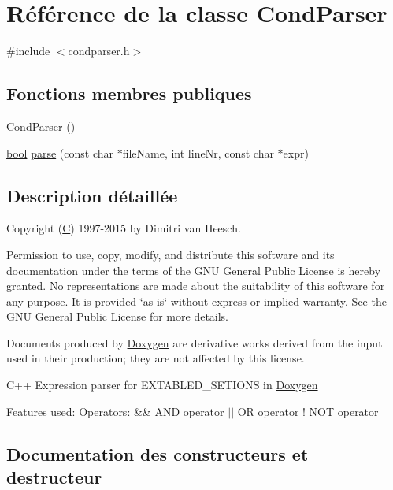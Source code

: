 \hypertarget{class_cond_parser}{}\section{Référence de la classe Cond\+Parser}
\label{class_cond_parser}


{\ttfamily \#include $<$condparser.\+h$>$}

\subsection*{Fonctions membres publiques}
\begin{DoxyCompactItemize}
\item 
\hyperlink{class_cond_parser_a28282ad4ee865a4601722ae5c4f7ea97}{Cond\+Parser} ()
\item 
\hyperlink{qglobal_8h_a1062901a7428fdd9c7f180f5e01ea056}{bool} \hyperlink{class_cond_parser_a81b78b3d5873b27da1d4dc1b7cdcb0b0}{parse} (const char $\ast$file\+Name, int line\+Nr, const char $\ast$expr)
\end{DoxyCompactItemize}


\subsection{Description détaillée}
Copyright (\hyperlink{class_c}{C}) 1997-\/2015 by Dimitri van Heesch.

Permission to use, copy, modify, and distribute this software and its documentation under the terms of the G\+N\+U General Public License is hereby granted. No representations are made about the suitability of this software for any purpose. It is provided \char`\"{}as is\char`\"{} without express or implied warranty. See the G\+N\+U General Public License for more details.

Documents produced by \hyperlink{class_doxygen}{Doxygen} are derivative works derived from the input used in their production; they are not affected by this license.

C++ Expression parser for E\+X\+T\+A\+B\+L\+E\+D\+\_\+\+S\+E\+T\+I\+O\+N\+S in \hyperlink{class_doxygen}{Doxygen}

Features used\+: Operators\+: \&\& A\+N\+D operator $\vert$$\vert$ O\+R operator ! N\+O\+T operator 

\subsection{Documentation des constructeurs et destructeur}
\hypertarget{class_cond_parser_a28282ad4ee865a4601722ae5c4f7ea97}{}
